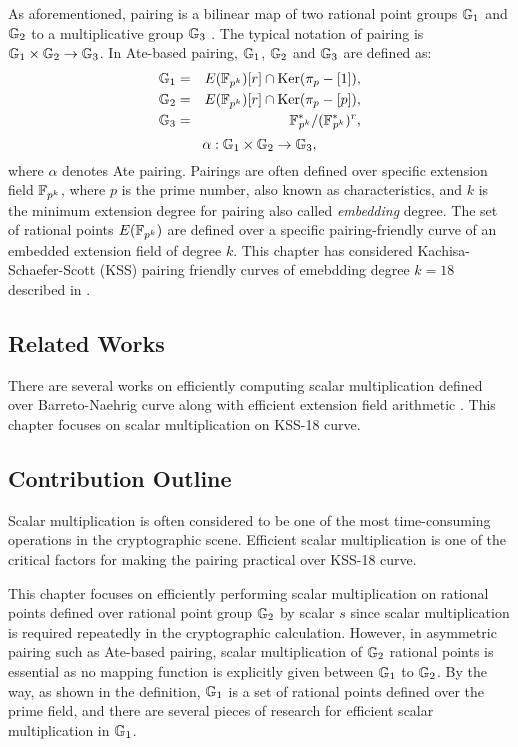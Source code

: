 As aforementioned, pairing is a bilinear map of two rational point groups ${\mathbb{G}}_{1}$ and ${\mathbb{G}}_{2}$ to a multiplicative group ${\mathbb{G}}_{3}$ \cite{Silverman}.
The typical notation of pairing is ${\mathbb{G}}_{1} \times {\mathbb{G}}_{2} \rightarrow {\mathbb{G}}_{3}$.
In  Ate-based pairing, ${\mathbb{G}}_{1}$, ${\mathbb{G}}_{2}$ and ${\mathbb{G}}_{3}$ are defined as:
\begin{eqnarray}\label{eqn_g1g2g3_group_kss18}
{\mathbb{G}}_{1} & = &  E({\mathbb{F}}_{p^{k}}) [r] \cap \text{Ker}(\pi_p - [1]), \nonumber \\
{\mathbb{G}}_{2} & = &  E({\mathbb{F}}_{p^{k}}) [r] \cap \text{Ker}(\pi_p - [p]), \nonumber \\
{\mathbb{G}}_{3} & = & {{\mathbb{F}}^{\ast}}_{\!\!\!p^{k}}/({{\mathbb{F}}^{\ast}}_{\!\!\!p^{k}})^r, \nonumber
\end{eqnarray}
\begin{equation}
\alpha : {\mathbb{G}}_{1} \times {\mathbb{G}}_{2} \rightarrow {\mathbb{G}}_{3},  \nonumber
\end{equation}
where $\alpha$ denotes Ate pairing.
Pairings are often defined over specific extension field $\mathbb{F}_{p^k}$, where $p$ is the prime number, also known as characteristics, and $k$  is the minimum extension degree for pairing also called \textit{embedding} degree. 
The set of rational points $E(\mathbb{F}_{p^k})$ are defined over a specific pairing-friendly curve of an embedded extension field of degree $k$.
This chapter has considered Kachisa-Schaefer-Scott (KSS) \cite{EPRINT:KacSchSco07} pairing friendly curves of emebdding degree $k=18$ described in \cite{EPRINT:FreScoTes06}.


\subsection{Related Works} 
There are several works \cite{DBLP:journals/ieicet/NogamiSONAM09}\cite{CANS:SNOKM08} on efficiently computing scalar multiplication defined over Barreto-Naehrig\cite{SAC:BarNae05} curve along with efficient extension field arithmetic \cite{C:BaiPaa98}. 
This chapter focuses on scalar multiplication on KSS-18 curve.

\subsection{Contribution Outline}
Scalar multiplication is often considered to be one of the most time-consuming operations in the cryptographic scene. 
Efficient scalar multiplication is one of the critical factors for making the pairing practical over KSS-18 curve.

This chapter focuses on efficiently performing scalar multiplication on rational points defined over rational point group ${\mathbb{G}}_{2}$ by scalar $s$ since scalar multiplication is required repeatedly in the cryptographic calculation.
However, in asymmetric pairing such as Ate-based pairing, scalar multiplication of ${\mathbb{G}}_{2}$ rational points is essential as no mapping function is explicitly given between ${\mathbb{G}}_{1}$ to ${\mathbb{G}}_{2}$.
By the way, as shown in the definition, ${\mathbb{G}}_{1}$ is a set of rational points defined over the prime field, and there are several pieces of research \cite{CANS:SNOKM08} for efficient scalar multiplication in ${\mathbb{G}}_{1}$.


